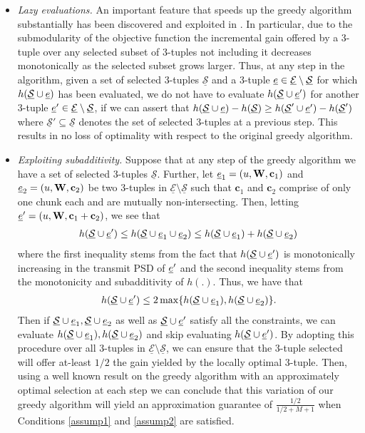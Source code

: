 \documentclass[11pt] {article}
\newcommand{\uwti}[1]{{\mathbf #1}}
\newcommand{\cb}{{\uwti c}}  \newcommand{\Cb}{{\uwti C}}
\newcommand{\Eulc} {{\underline{\mathcal E}}}
\newcommand{\Sulc} {{\underline{\mathcal S}}}
\begin{document}
\begin{itemize}
\item {\em Lazy evaluations.} An important feature that speeds up the greedy algorithm substantially has been discovered and exploited in \cite{Minoux:greedy,krause:greedy}. In particular, due to the submodularity  of the objective function the incremental gain offered by a 3-tuple over any selected subset of 3-tuples not including it decreases monotonically as the selected subset grows larger.
    Thus, at any step in the algorithm, given a set of selected 3-tuples $\Sulc$ and a 3-tuple $\eul\in\Eulc\setminus\Sulc$ for which $h(\Sulc\cup\eul)$ has been evaluated, we do not have to evaluate $h(\Sulc\cup\eul')$ for another 3-tuple $\eul'\in\Eulc\setminus\Sulc$, if we can assert that $h(\Sulc\cup\eul)-h(\Sulc)\geq h(\Sulc'\cup\eul')-h(\Sulc')$ where $\Sulc'\subseteq\Sulc$ denotes the set of selected 3-tuples at a previous step. This results in no loss of optimality with respect to the original greedy algorithm.




\item {\em Exploiting subadditivity.}
Suppose that at any step of the greedy algorithm  we have a set of selected 3-tuples $\Sulc$.
 Further, let $\eul_1=(u,\Wb,\cb_1)$ and $\eul_2=(u,\Wb,\cb_2)$  be two 3-tuples in $\Eulc\setminus\Sulc$ such that $\cb_1$ and $\cb_2$ comprise of only one chunk each and are mutually non-intersecting. Then, letting $\eul'=(u,\Wb,\cb_1+\cb_2)$, we see that
 \begin{eqnarray}
 h(\Sulc\cup\eul')\leq h(\Sulc\cup\eul_1\cup\eul_2)\leq h(\Sulc\cup\eul_1) + h(\Sulc\cup\eul_2)
   \end{eqnarray}
   where the first inequality stems from the fact that $h(\Sulc\cup\eul')$ is monotonically increasing in the transmit PSD of ${\underline e}'$  and the second inequality stems from the monotonicity and subadditivity of $h(.)$. Thus, we have that
   \begin{eqnarray}
 h(\Sulc\cup\eul')\leq 2\max\{ h(\Sulc\cup\eul_1), h(\Sulc\cup\eul_2)\}.
   \end{eqnarray}
 Then if  $\Sulc\cup\eul_1,\Sulc\cup\eul_2$ as well as $\Sulc\cup\eul'$ satisfy all the constraints,
  we can evaluate $h(\Sulc\cup\eul_1), h(\Sulc\cup\eul_2)$ and skip evaluating $h(\Sulc\cup\eul')$. By adopting this procedure over all 3-tuples in   $\Eulc\setminus\Sulc$, we can ensure that the 3-tuple selected will offer at-least $1/2$ the gain yielded by the locally optimal 3-tuple. Then, using a well known result on the greedy algorithm with an approximately optimal selection at each step \cite{nemhaus:analysis} we can conclude that this variation of our greedy algorithm will yield an approximation guarantee of
 $ \frac{1/2}{1/2+M+1}$ when Conditions \ref{assump1} and \ref{assump2} are satisfied.
\end{itemize}
\end{document}

